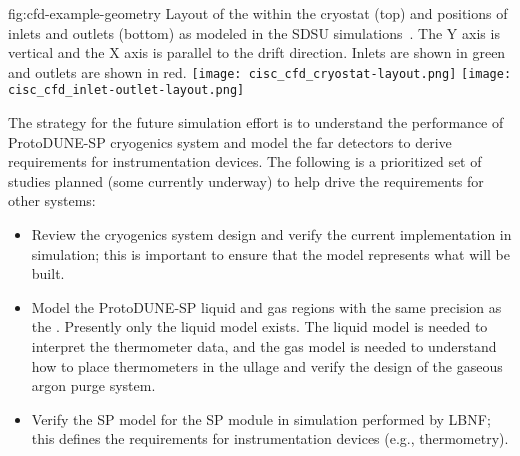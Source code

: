 \begin{dunefigure}{fig:cfd-example-geometry}
  {Layout of the  within the cryostat (top) and positions of  inlets and outlets (bottom) as modeled in the SDSU  simulations~\cite{docdb-5915}. The Y axis is vertical and the X axis is parallel to the  drift direction. Inlets are shown in green and outlets are shown in red.}
  \texttt{[image: cisc\_cfd\_cryostat-layout.png]}
  \texttt{[image: cisc\_cfd\_inlet-outlet-layout.png]}
\end{dunefigure}

The strategy for the future  simulation effort is to understand the performance of ProtoDUNE-SP cryogenics system and model the far detectors to derive requirements for instrumentation devices. The following is a prioritized set of studies planned (some currently underway) to help drive the requirements for other systems:
\begin{itemize}
\item Review the   cryogenics system design and verify the current implementation in simulation; this is important to ensure that the model represents what will be built.
\item 
Model the ProtoDUNE-SP liquid and gas regions with the same precision as the . Presently only the liquid model exists. The liquid model is needed to interpret the thermometer data, and the gas model is needed to understand how to place thermometers in the ullage and verify the design of the gaseous argon purge system.
\item Verify the SP  model for the  SP module in simulation performed by LBNF; this defines the requirements for instrumentation devices (e.g., thermometry).
\end{itemize}

